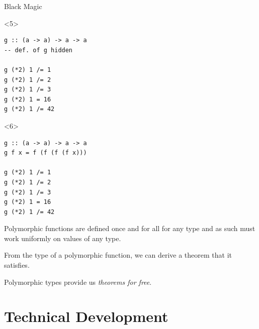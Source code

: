 \documentclass{beamer}
\begin{document}
\begin{frame}[fragile]{Black Magic}
\begin{onlyenv}<5>
\begin{verbatim}
g :: (a -> a) -> a -> a
-- def. of g hidden

g (*2) 1 /= 1
g (*2) 1 /= 2
g (*2) 1 /= 3
g (*2) 1 = 16
g (*2) 1 /= 42
\end{verbatim}
\end{onlyenv}

\begin{onlyenv}<6>
\begin{verbatim}
g :: (a -> a) -> a -> a
g f x = f (f (f (f x)))

g (*2) 1 /= 1
g (*2) 1 /= 2
g (*2) 1 /= 3
g (*2) 1 = 16
g (*2) 1 /= 42
\end{verbatim}
\end{onlyenv}


\end{frame}

\begin{frame}
\Large Polymorphic functions are defined once and for all for any type and as such must work uniformly on values of any type.

\pause

\Large From the type of a polymorphic function,
we can derive a theorem that it satisfies.
\end{frame}

\begin{frame}
\centering \huge Polymorphic types provide us \emph{theorems for free}.
\end{frame}

\section{Technical Development}
\end{document}
